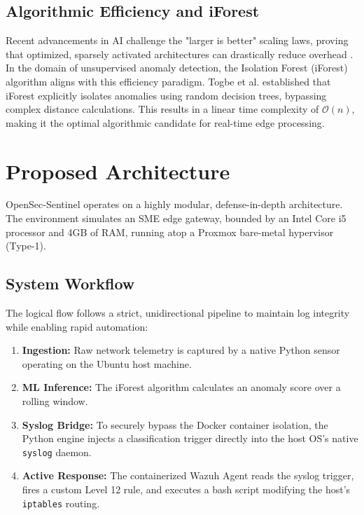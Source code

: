 \documentclass[conference]{IEEEtran}
\begin{document}
	\subsection{Algorithmic Efficiency and iForest}
	Recent advancements in AI challenge the "larger is better" scaling laws, proving that optimized, sparsely activated architectures can drastically reduce overhead \cite{deepseek2024}. In the domain of unsupervised anomaly detection, the Isolation Forest (iForest) algorithm aligns with this efficiency paradigm. Togbe et al. \cite{togbe2022} established that iForest explicitly isolates anomalies using random decision trees, bypassing complex distance calculations. This results in a linear time complexity of $\mathcal{O}(n)$, making it the optimal algorithmic candidate for real-time edge processing.
	
	\section{Proposed Architecture}
	OpenSec-Sentinel operates on a highly modular, defense-in-depth architecture. The environment simulates an SME edge gateway, bounded by an Intel Core i5 processor and 4GB of RAM, running atop a Proxmox bare-metal hypervisor (Type-1). 
	
	\subsection{System Workflow}
	The logical flow follows a strict, unidirectional pipeline to maintain log integrity while enabling rapid automation:
	\begin{enumerate}
		\item \textbf{Ingestion:} Raw network telemetry is captured by a native Python sensor operating on the Ubuntu host machine.
		\item \textbf{ML Inference:} The iForest algorithm calculates an anomaly score over a rolling window.
		\item \textbf{Syslog Bridge:} To securely bypass the Docker container isolation, the Python engine injects a classification trigger directly into the host OS's native \texttt{syslog} daemon.
		\item \textbf{Active Response:} The containerized Wazuh Agent reads the syslog trigger, fires a custom Level 12 rule, and executes a bash script modifying the host's \texttt{iptables} routing.
	\end{enumerate}
	
\end{document}
